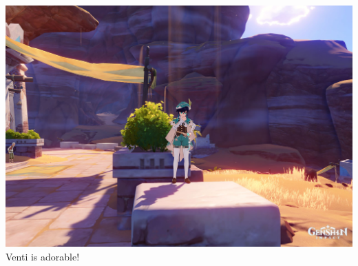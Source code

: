 \begin{center}
    \includegraphics[scale=0.15]{venti.jpg} \\
    \small{Venti is adorable!}
\end{center}